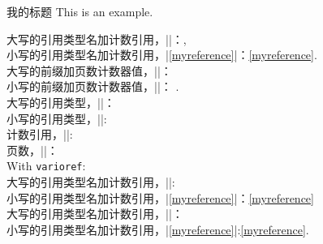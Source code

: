 \begin{dispExample}
\begin{mybluebox}[label={myreference}]{我的标题}
This is an example.
\end{mybluebox}

大写的引用类型名加计数引用，||：,\\ 
小写的引用类型名加计数引用，|\cref{myreference}|：\cref{myreference}.\\

大写的前缀加页数计数器值，||：\\
小写的前缀加页数计数器值，||： .\\

大写的引用类型，||：\\
小写的引用类型，||:\\

计数引用，||:\\
页数，||：\\

With \texttt{varioref}:\\
大写的引用类型名加计数引用，||:\\
小写的引用类型名加计数引用，|\vref{myreference}|：\vref{myreference}\\

大写的引用类型名加计数引用，||：\\
小写的引用类型名加计数引用，|\vref*{myreference}|:\vref*{myreference}.
\end{dispExample}


